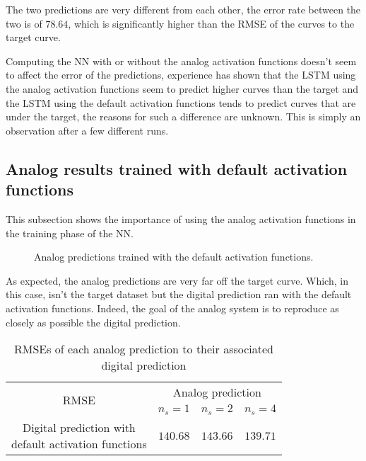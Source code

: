 The two predictions are very different from each other, the error rate between the two is of $78.64$, which is significantly higher than the \ac{RMSE} of the curves to the target curve.

Computing the \ac{NN} with or without the analog activation functions doesn't seem to affect the error of the predictions, experience has shown that the \ac{LSTM} using the analog activation functions seem to predict higher curves than the target and the \ac{LSTM} using the default activation functions tends to predict curves that are under the target, the reasons for such a difference are unknown. This is simply an observation after a few different runs.

\subsection{Analog results trained with default activation functions}\label{subsec:airlineAnalogNoC}

This subsection shows the importance of using the analog activation functions in the training phase of the \ac{NN}.

\begin{figure}[H]
  \centering
  
  \caption{Analog predictions trained with the default activation functions.}
  \label{graph:airlineAnalogNoC}
\end{figure}

As expected, the analog predictions are very far off the target curve. Which, in this case, isn't the target dataset but the digital prediction ran with the default activation functions. Indeed, the goal of the analog system is to reproduce as closely as possible the digital prediction.

\begin{table}[H]
  \centering
  \begin{tabular}{|c|c|c|c|}
    \hline
    \multirow{2}{*}{\acs{RMSE}} & \multicolumn{3}{|c|}{Analog prediction}\\
    \cline{2-4}
    & $n_s=1$ & $n_s=2$ & $n_s=4$ \\
    \hline
    \specialcell{Digital prediction with\\default activation functions} & $140.68$ & $143.66$ & $139.71$\\
    \hline
  \end{tabular}
  \caption{\acp{RMSE} of each analog prediction to their associated digital prediction}
  \label{tab:airlineAnalogNoC}
\end{table}

